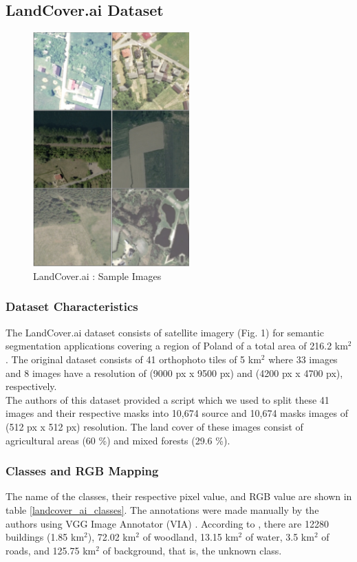 \documentclass[conference]{IEEEtran}
\begin{document}
\subsection{LandCover.ai Dataset}

\begin{figure}[h]
    \centering
    \includegraphics[width=6cm, height=9cm]{images/dataset-vis.png}
    \caption{LandCover.ai : Sample Images}
\end{figure}

\subsubsection{Dataset Characteristics}
The LandCover.ai dataset consists of satellite imagery (Fig. 1) for semantic segmentation applications covering a region of Poland of a total area of 216.2 km$^2$  \cite{DBLP:journals/corr/abs-2005-02264}. The original dataset consists of 41 orthophoto tiles of 5 km$^2$ where 33 images and 8 images have a resolution of (9000 px x 9500 px) and (4200 px x 4700 px), respectively. \\ \indent
The authors of this dataset \cite{DBLP:journals/corr/abs-2005-02264} provided a script which we used to split these 41 images and their respective masks into 10,674 source and 10,674 masks images of (512 px x 512 px) resolution. The land cover of these images consist of agricultural areas (60 \%) and mixed forests (29.6 \%). \\ \indent



\subsubsection{Classes and RGB Mapping}
The name of the classes, their respective pixel value, and RGB value are shown in table \ref{landcover_ai_classes}. The annotations were made manually by the authors using VGG  Image Annotator (VIA) \cite{dutta2019vgg}. According to \cite{DBLP:journals/corr/abs-2005-02264}, there are 12280 buildings (1.85 km$^2$), 72.02 km$^2$ of woodland, 13.15 km$^2$ of water, 3.5 km$^2$ of roads, and 125.75 km$^2$ of background, that is, the unknown class. \\
\end{document}
